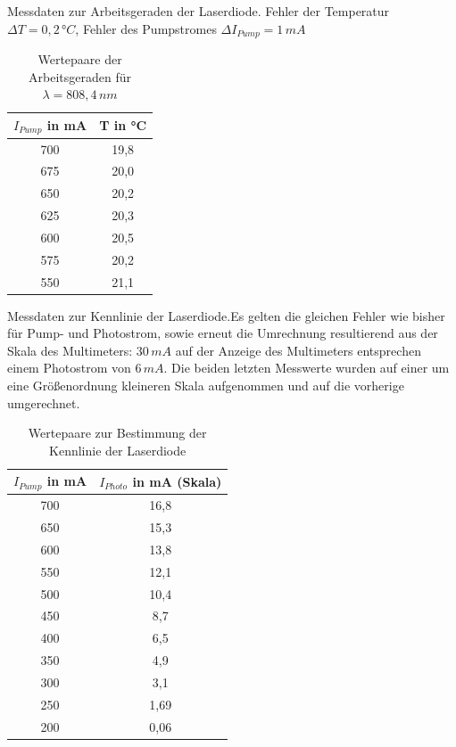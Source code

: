 \documentclass[twoside,colorback,accentcolor=tud4c,11pt]{tudreport}
\begin{document}
Messdaten zur Arbeitsgeraden der Laserdiode. Fehler der Temperatur $\Delta T=0,2\,\si{°C}$, Fehler des Pumpstromes $\Delta I_{Pump}=1\,\si{mA}$

\begin{table}[H]
\renewcommand*{\arraystretch}{1.2}
\centering
\begin{tabular}{|c|c|}
\hline 
$I_{Pump}$ in mA & T in °C\\
\hline 
700 & 19,8  \\ 
\hline 
675 & 20,0  \\ 
\hline 
650 & 20,2  \\ 
\hline 
625 & 20,3  \\ 
\hline 
600 & 20,5  \\ 
\hline
575 & 20,2 \\ 
\hline
550 & 21,1 \\ 
\hline
\end{tabular} 
\caption{Wertepaare der Arbeitsgeraden für $\lambda =808,4\,\si{nm}$}\label{arbger}
\end{table}


Messdaten zur Kennlinie der Laserdiode.Es gelten die gleichen Fehler wie bisher für Pump- und Photostrom, sowie erneut die Umrechnung resultierend aus der Skala des Multimeters: $30\,\si{mA}$ auf der Anzeige des Multimeters entsprechen einem Photostrom von $6\,\si{mA}$. Die beiden letzten Messwerte wurden auf einer um eine Größenordnung kleineren Skala aufgenommen und auf die vorherige umgerechnet.
\begin{table}[H]
\renewcommand*{\arraystretch}{1.2}
\centering
\begin{tabular}{|c|c|}
\hline 
$I_{Pump}$ in mA & $I_{Photo}$ in mA (Skala)\\
\hline 
700 & 16,8  \\ 
\hline 
650 & 15,3  \\ 
\hline 
600 & 13,8  \\ 
\hline 
550 & 12,1  \\ 
\hline 
500 & 10,4  \\ 
\hline
450 & 8,7 \\ 
\hline
400 & 6,5 \\ 
\hline
350 & 4,9 \\ 
\hline
300 & 3,1 \\ 
\hline
250 & 1,69 \\ 
\hline
200 & 0,06 \\ 
\hline
\end{tabular} 
\caption{Wertepaare zur Bestimmung der Kennlinie der Laserdiode}\label{kennd}
\end{table}
\end{document}
